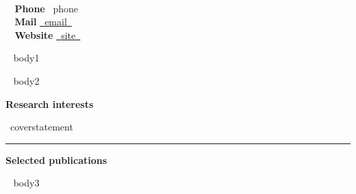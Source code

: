 \documentclass[a4paper]{article}
\newcommand{\block}[1]{\hrule \vspace{0.2cm} \textbf{\Large #1} \vspace{0.2cm}}
\newcommand{\blockNp}[1]{\newpage \textbf{\Large #1} \vspace{0.2cm}}
\newcommand{\skill}[2]{\textbf{#1} \hfill #2 \\}
\begin{document}
\begin{minipage}[c]{0.6\columnwidth}
    \\
\end{minipage} 
\hfill
\begin{minipage}[t]{0.375\columnwidth}
    \skill{\faPhone~ Phone}{~{{phone}}~}
    \skill{\faEnvelope~ Mail}{\href{mailto:~{{email}}~}{~{{email}}~}}
    \skill{\faGlobe~ Website}{\href{~{{site}}~}{~{{site}}~}}
\end{minipage}
\vspace{-0.25em}



\begin{minipage}[t]{0.6\columnwidth}
    ~{{ body1 }}~
\end{minipage} 
\hfill
\begin{minipage}[t]{0.375\columnwidth}
    ~{{ body2 }}~
\end{minipage}


\blockNp{Research interests}

{~{{coverstatement}}~}

\vspace{0.3cm}

\block{Selected publications}
\nocite{Miti2021,Miti2019,Miti2019a}
\printbibliography[heading=none]
\vspace{.5em}

~{{ body3 }}~
\end{document}
